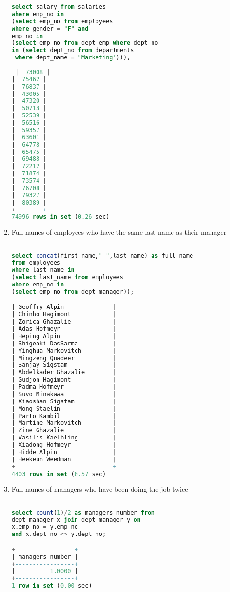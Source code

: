 \documentclass[12pt, letterpaper, twoside]{article}
\begin{document}
\begin{enumerate}
\begin{lstlisting}[language=SQL]
select salary from salaries
where emp_no in 
(select emp_no from employees 
where gender = "F" and
emp_no in
(select emp_no from dept_emp where dept_no 
in (select dept_no from departments
 where dept_name = "Marketing")));
 
 |  73008 |
|  75462 |
|  76837 |
|  43005 |
|  47320 |
|  50713 |
|  52539 |
|  56516 |
|  59357 |
|  63601 |
|  64778 |
|  65475 |
|  69488 |
|  72212 |
|  71874 |
|  73574 |
|  76708 |
|  79327 |
|  80389 |
+--------+
74996 rows in set (0.26 sec)


\end{lstlisting}

\item Full names of employees who have the same last name as their manager
\begin{lstlisting}[language=SQL]

select concat(first_name," ",last_name) as full_name
from employees 
where last_name in 
(select last_name from employees
where emp_no in 
(select emp_no from dept_manager));

| Geoffry Alpin              |
| Chinho Hagimont            |
| Zorica Ghazalie            |
| Adas Hofmeyr               |
| Heping Alpin               |
| Shigeaki DasSarma          |
| Yinghua Markovitch         |
| Mingzeng Quadeer           |
| Sanjay Sigstam             |
| Abdelkader Ghazalie        |
| Gudjon Hagimont            |
| Padma Hofmeyr              |
| Suvo Minakawa              |
| Xiaoshan Sigstam           |
| Mong Staelin               |
| Parto Kambil               |
| Martine Markovitch         |
| Zine Ghazalie              |
| Vasilis Kaelbling          |
| Xiadong Hofmeyr            |
| Hidde Alpin                |
| Heekeun Weedman            |
+----------------------------+
4403 rows in set (0.57 sec)

\end{lstlisting}

\item Full names of managers who have been doing the job twice
\begin{lstlisting}[language=SQL]

select count(1)/2 as managers_number from
dept_manager x join dept_manager y on
x.emp_no = y.emp_no
and x.dept_no <> y.dept_no;

+-----------------+
| managers_number |
+-----------------+
|          1.0000 |
+-----------------+
1 row in set (0.00 sec)


\end{lstlisting}


\end{enumerate}
\end{document}
